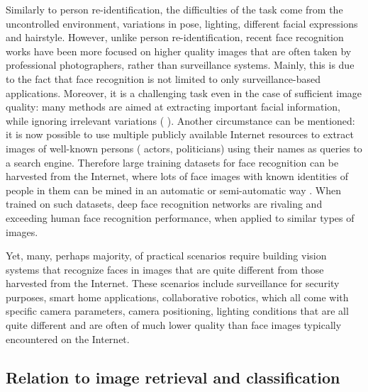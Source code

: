 Similarly to person re-identification, the difficulties of the task come from the uncontrolled environment, \eg{} variations in pose, lighting, different facial expressions and hairstyle.
However, unlike person re-identification, recent face recognition works have been more focused on higher quality images that are often taken by professional photographers, rather than surveillance systems. Mainly, this is due to the fact that face recognition is not limited to only surveillance-based applications. Moreover, it is a challenging task even in the case of sufficient image quality: many methods are aimed at extracting important facial information, while ignoring irrelevant variations (\eg{} \citep{Chopra05,parkhi2015deep,SchroffKP15}). Another circumstance can be mentioned: it is now possible to use multiple publicly available Internet resources to extract images of well-known persons (\eg{} actors, politicians) using their names as queries to a search engine. Therefore large training datasets for face recognition can be harvested from the Internet, where lots of face images with known identities of people in them can be mined in an automatic or semi-automatic way \citep{parkhi2015deep}. When trained on such datasets, deep face recognition networks are rivaling and exceeding human face recognition performance, when applied to similar types of images. 

Yet, many, perhaps majority, of practical scenarios require building vision systems that recognize faces in images that are quite different from those harvested from the Internet. These scenarios include surveillance for security purposes, smart home applications, collaborative robotics, which all come with specific camera parameters, camera positioning, lighting conditions that are all quite different and are often of much lower quality than face images typically encountered on the Internet.  %



\subsection{Relation to image retrieval and classification}

